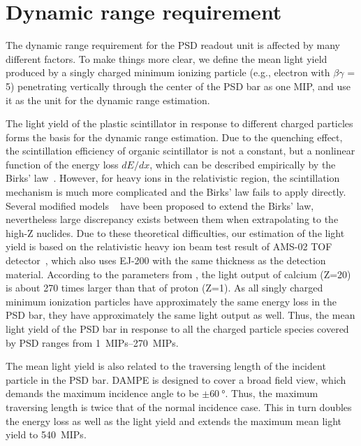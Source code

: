 \documentclass[preprint, times]{elsarticle}
\begin{document}
\section{Dynamic range requirement}
\label{sec:requirement}

The dynamic range requirement for the PSD readout unit is affected by many different factors.
To make things more clear, we define the mean light yield produced by a singly charged minimum ionizing particle (e.g., electron with $\beta\gamma$ = 5) penetrating vertically through the center of the PSD bar as one MIP, and use it as the unit for the dynamic range estimation.

The light yield of the plastic scintillator in response to different charged particles forms the basis for the dynamic range estimation.
Due to the quenching effect, the scintillation efficiency of organic scintillator is not a constant, but a nonlinear function of the energy loss $dE/dx$, which can be described empirically by the Birks' law~\cite{birks_theory_2013}.
 However, for heavy ions in the relativistic region, the scintillation mechanism is much more complicated and the Birks' law fails to apply directly. 
 Several modified models ~\cite{chou_nature_1952,tarle_cosmic_1979,menchaca-rocha_response_1999,matsufuji_response_1999} have been proposed to extend the Birks' law, nevertheless large discrepancy exists between them when extrapolating to the high-Z nuclides.
Due to these theoretical difficulties, our estimation of the light yield is based on the relativistic heavy ion beam test result of AMS-02 TOF detector~\cite{bindi2005performance,bindi_calibration_2014}, which also uses EJ-200 with the same thickness as the detection material.
According to the parameters from \cite{bindi2005performance}, the light output of calcium (Z=20) is about 270 times larger than that of proton (Z=1).
As all singly charged minimum ionization particles have approximately the same energy loss in the PSD bar, they have approximately the same light output as well.
Thus, the mean light yield of the PSD bar in response to all the charged particle species covered by PSD ranges from \SIrange{1}{270}{MIPs}.

The mean light yield is also related to the traversing length of the incident particle in the PSD bar.
DAMPE is designed to cover a broad field view, which demands the maximum incidence angle to be $\pm\SI{60}{\degree}$.
Thus, the maximum traversing length is twice that of the normal incidence case.
This in turn doubles the energy loss as well as the light yield and extends the maximum mean light yield to \SI{540}{MIPs}.
\end{document}
